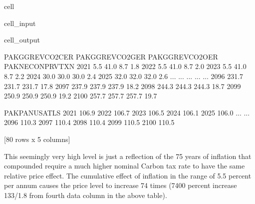 \documentclass[letterpaper,10pt,english]{jupyterBook}
\begin{document}
\begin{sphinxuseclass}{cell}\begin{sphinxVerbatimInput}

\begin{sphinxuseclass}{cell_input}
\begin{sphinxVerbatim}[commandchars=\\\{\}]
\PYG{p}{[}\PYG{p}{]}
\end{sphinxVerbatim}

\end{sphinxuseclass}\end{sphinxVerbatimInput}
\begin{sphinxVerbatimOutput}

\begin{sphinxuseclass}{cell_output}
\begin{sphinxVerbatim}[commandchars=\\\{\}]
      PAKGGREVCO2CER  PAKGGREVCO2GER  PAKGGREVCO2OER  PAKNECONPRVTXN  \PYGZbs{}
2021            \PYGZhy{}5.5           \PYGZhy{}41.0            \PYGZhy{}8.7             1.8   
2022            \PYGZhy{}5.5           \PYGZhy{}41.0            \PYGZhy{}8.7             2.0   
2023            \PYGZhy{}5.5           \PYGZhy{}41.0            \PYGZhy{}8.7             2.2   
2024            30.0            30.0            30.0             2.4   
2025            32.0            32.0            32.0             2.6   
...              ...             ...             ...             ...   
2096           231.7           231.7           231.7            17.8   
2097           237.9           237.9           237.9            18.2   
2098           244.3           244.3           244.3            18.7   
2099           250.9           250.9           250.9            19.2   
2100           257.7           257.7           257.7            19.7   

      PAKPANUSATLS  
2021         106.9  
2022         106.7  
2023         106.5  
2024         106.1  
2025         106.0  
...            ...  
2096         110.3  
2097         110.4  
2098         110.4  
2099         110.5  
2100         110.5  

[80 rows x 5 columns]
\end{sphinxVerbatim}

\end{sphinxuseclass}\end{sphinxVerbatimOutput}

\end{sphinxuseclass}
\sphinxAtStartPar
This seemingly very high level is just a reflection of the 75 years of inflation that compounded require a much higher nominal Carbon tax rate to have the same relative price effect. The cumulative effect of inflation in the range of 5.5 percent per annum causes the price level to increase 74 times (7400 percent increase  133/1.8 from fourth data column in the above table).
\end{document}
